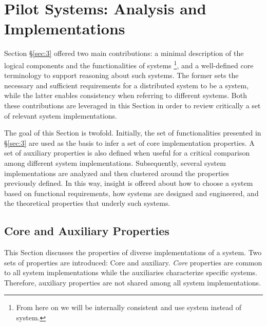 \documentclass{sig-alternate}
\begin{document}

\section{Pilot Systems: Analysis and Implementations}
\label{sec:4}

Section \S\ref{sec:3} offered two main contributions: a minimal description of
the logical components and the functionalities of \pilot systems \footnote{
From here on we will be internally consistent and use \pilot system instead of
\pilotjob system.}, and a well-defined core terminology to support reasoning
about such systems.
The former sets the necessary and sufficient requirements for a distributed
system to be a \pilot system, while the latter enables consistency when
referring to different \pilot systems. Both these contributions are leveraged
in this Section in order to review critically a set of relevant \pilot system
implementations.

The goal of this Section is twofold.  Initially, the set of
functionalities presented in \S\ref{sec:3} are used as the basis
to infer a set of core implementation properties. A set of auxiliary
properties is also defined when useful for a critical comparison among
different \pilot system implementations. Subsequently, several \pilot system
implementations are analyzed and then clustered around the properties
previously defined. In this way, insight is offered about how to
choose a \pilot system based on functional requirements, how
\pilot systems are designed and engineered, and the theoretical
properties that underly such systems.

\subsection{Core and Auxiliary Properties}

This Section discusses the properties of diverse implementations of a \pilot
system. Two sets of properties are introduced: Core and auxiliary.
\textit{Core} properties are common to all \pilot system implementations while
the auxiliaries characterize specific \pilot systems. Therefore, auxiliary
properties are not shared among all \pilot system implementations.
\end{document}
